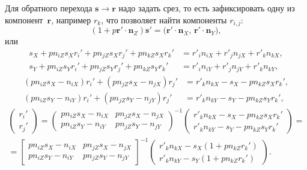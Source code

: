 \documentclass[12pt]{article}
\def\r{\mathbf r{}}
\def\s{\mathbf s{}}
\def\n{\mathbf n{}}
\begin{document}
Для обратного перехода $\s\to\r$ надо задать срез, то есть зафиксировать одну из компонент~$\r$, например $r_k$, что позволяет найти компоненты $r_{i,j}$: 
\begin{equation}
(1 + p\r'\cdot\n_Z)\s'= \Big(\r'\cdot\n_X ,\, \r'\cdot\n_Y \Big),
\end{equation}
или
\begin{align}
s_X + p  n_{iZ} s_X r_i' + p  n_{jZ} s_X r_j' + p  n_{kZ} s_X r_k' &= r'_i n_{iX} + r'_j n_{jX} + r'_k n_{kX}, \\
s_Y + p  n_{iZ} s_Y r_i' + p  n_{jZ} s_Y r_j' + p  n_{kZ} s_Y r_k' &= r'_i n_{iY} + r'_j n_{jY} + r'_k n_{kY}, 
\end{align}
\begin{align}
 (p  n_{iZ} s_X - n_{iX})r_i' + (p  n_{jZ} s_X - n_{jX})r_j'  &= r'_k n_{kX} - s_X -  p  n_{kZ} s_X r_k', \\
 (p  n_{iZ} s_Y - n_{iY})r_i' + (p  n_{jZ} s_Y - n_{jY})r_j'  &= r'_k n_{kY} - s_Y - p  n_{kZ} s_Y r_k', 
\end{align}
\begin{multline}
  \left(\begin{matrix} r_i' \\ r_j' \end{matrix}\right) =
  \left(\begin{matrix}
      p  n_{iZ} s_X - n_{iX} &  p  n_{jZ} s_X - n_{jX} \\
      p  n_{iZ} s_Y - n_{iY} & p  n_{jZ} s_Y - n_{jY} \end{matrix}\right)^{-1}
  \left(\begin{matrix}
      r'_k n_{kX} - s_X -  p  n_{kZ} s_X r_k' \\
      r'_k n_{kY} - s_Y - p  n_{kZ} s_Y r_k'  \end{matrix}\right)
  =\\=
  \left[\begin{matrix}
      p  n_{iZ} s_X - n_{iX} &  p  n_{jZ} s_X - n_{jX} \\
      p  n_{iZ} s_Y - n_{iY} & p  n_{jZ} s_Y - n_{jY} \end{matrix}\right]^{-1}
  \left(\begin{matrix}
      r'_k n_{kX} - s_X (1+  p  n_{kZ} r_k') \\
      r'_k n_{kY} - s_Y (1+ p  n_{kZ}  r_k')  \end{matrix}\right).
\end{multline}
\end{document}
